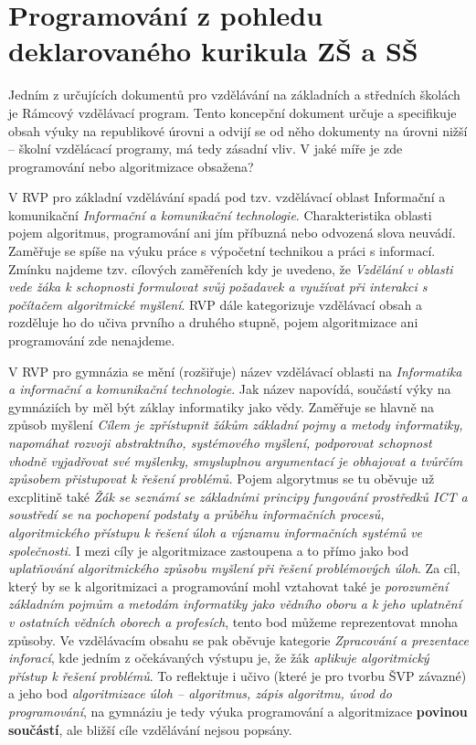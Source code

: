 \documentclass[FP,DP]{tulthesis}
\begin{document}
{\section{Programování z pohledu deklarovaného kurikula ZŠ a SŠ}
Jedním z určujících dokumentů pro vzdělávání na základních a středních školách je Rámcový vzdělávací program. Tento koncepční dokument určuje a specifikuje obsah výuky na republikové úrovni a odvijí se od něho dokumenty na úrovni nižší -- školní vzdělácací programy, má tedy zásadní vliv. V jaké míře je zde programování nebo algoritmizace obsažena?
 
V RVP pro základní vzdělávání \citep{rvpzv} spadá pod tzv. vzdělávací oblast Informační a komunikační \textit{Informační a komunikační technologie}. Charakteristika oblasti pojem algoritmus, programování ani jím příbuzná nebo odvozená slova neuvádí. Zaměřuje se spíše na výuku práce s výpočetní technikou a práci s informací. Zmínku najdeme tzv. cílových zaměřeních kdy je uvedeno, že \textit{Vzdělání v oblasti vede žáka k schopnosti formulovat svůj požadavek a využívat při interakci s počítačem algoritmické myšlení}. RVP dále kategorizuje vzdělávací obsah a rozděluje ho do učiva prvního a druhého stupně, pojem algoritmizace ani programování zde nenajdeme. 

V RVP pro gymnázia se mění (rozšiřuje) název vzdělávací oblasti na \textit {Informatika a informační a komunikační technologie}. Jak název napovídá, součástí výky na gymnáziích by měl být záklay informatiky jako vědy. Zaměřuje se hlavně na způsob myšlení \textit {Cílem je zpřístupnit žákům základní pojmy a metody informatiky, napomáhat rozvoji abstraktního, systémového myšlení, podporovat schopnost vhodně vyjadřovat své myšlenky, smysluplnou argumentací je obhajovat a tvůrčím způsobem přistupovat k řešení problémů.} Pojem algorytmus se tu oběvuje už excplitině také \textit {Žák se seznámí se základními principy fungování prostředků ICT a soustředí se na pochopení podstaty a průběhu informačních procesů, algoritmického přístupu k řešení úloh a významu informačních systémů ve společnosti.} I mezi cíly je algoritmizace zastoupena a to přímo jako bod \textit {uplatňování algoritmického způsobu myšlení při řešení problémových úloh}. Za cíl, který by se k algoritmizaci a programování mohl vztahovat také je \textit {porozumění základním pojmům a metodám informatiky jako vědního oboru a k jeho uplatnění v ostatních vědních oborech a profesích}, tento bod můžeme reprezentovat mnoha způsoby. Ve vzdělávacím obsahu se pak oběvuje kategorie \textit {Zpracování  a prezentace inforací}, kde jedním z očekávaných výstupu je, že žák \textit {aplikuje algoritmický přístup k řešení problémů}. To reflektuje i učivo (které je pro tvorbu ŠVP závazné) a jeho bod \textit {algoritmizace úloh – algoritmus, zápis algoritmu, úvod do programování}, na gymnáziu je tedy výuka programování a algoritmizace \textbf{povinou součástí}, ale bližší cíle vzdělávání nejsou popsány.

}
\end{document}
